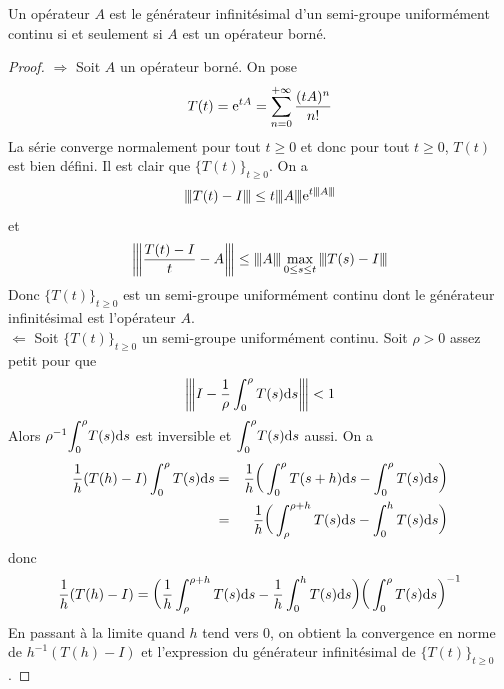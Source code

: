 \begin{theorem}\label{thm_equiv_generateur_op_borne}
    Un opérateur $A$ est le générateur infinitésimal d'un semi-groupe uniformément continu si et seulement si $A$ est un opérateur borné.
\end{theorem}

\begin{proof}
    $\boxed{\Longrightarrow}$ Soit $A$ un opérateur borné. On pose 
    \begin{equation*}
        T(t) = \mathrm{e}^{tA} = \sum_{n=0}^{+\infty}\frac{(tA)^n}{n!}
    \end{equation*}
    La série converge normalement pour tout $t \geq 0$ et donc pour tout $t \geq 0$, $T(t)$ est bien défini. Il est clair que $\big\{T(t)\big\}_{t \geq 0}$. On a 
    \begin{equation*}
        {\left\vert\kern-0.25ex\left\vert \kern-0.25ex\left\vert T(t)-I \right\vert\kern-0.25ex\right\vert\kern-0.25ex\right\vert} \leq t{\left\vert\kern-0.25ex\left\vert \kern-0.25ex\left\vert A \right\vert\kern-0.25ex\right\vert\kern-0.25ex\right\vert}\mathrm{e}^{t{\left\vert\kern-0.25ex\left\vert \kern-0.25ex\left\vert A \right\vert\kern-0.25ex\right\vert\kern-0.25ex\right\vert}}
    \end{equation*}
    et 
    \begin{equation*}
        {\left\vert\kern-0.25ex\left\vert \kern-0.25ex\left\vert \frac{T(t)-I}{t}-A \right\vert\kern-0.25ex\right\vert\kern-0.25ex\right\vert} \leq {\left\vert\kern-0.25ex\left\vert \kern-0.25ex\left\vert A \right\vert\kern-0.25ex\right\vert\kern-0.25ex\right\vert}\max_{0\leq s \leq t}{\left\vert\kern-0.25ex\left\vert \kern-0.25ex\left\vert T(s)-I \right\vert\kern-0.25ex\right\vert\kern-0.25ex\right\vert}
    \end{equation*}
    Donc $\big\{T(t)\big\}_{t \geq 0}$ est un semi-groupe uniformément continu dont le générateur infinitésimal est l'opérateur $A$. \\
    $\boxed{\Longleftarrow}$ Soit $\big\{T(t)\big\}_{t \geq 0}$ un semi-groupe uniformément continu. Soit $\rho >0$ assez petit pour que 
    \begin{equation*}
        {\left\vert\kern-0.25ex\left\vert \kern-0.25ex\left\vert I-\frac{1}{\rho}\int_0^\rho T(s)\mathrm{d}s \right\vert\kern-0.25ex\right\vert\kern-0.25ex\right\vert} <1
    \end{equation*}
    Alors $\rho^{-1}\displaystyle{\int_0^\rho} T(s)\mathrm{d} s$ est inversible et $\displaystyle{\int_0^\rho} T(s)\mathrm{d} s$ aussi. On a 
    \begin{eqnarray*}
        \frac{1}{h}(T(h)-I)\int_0^\rho T(s)\mathrm{d} s &=& \frac{1}{h}\bigg(\int_0^\rho T(s+h)\mathrm{d} s - \int_0^\rho T(s)\mathrm{d} s\bigg)\\
        &=& \frac{1}{h} \bigg(\int_\rho^{\rho+h}T(s)\mathrm{d} s - \int_0^hT(s)\mathrm{d} s\bigg)
    \end{eqnarray*}
    donc 
    \begin{equation*}
        \frac{1}{h}(T(h)-I) = \bigg(\frac{1}{h}\int_\rho^{\rho+h}T(s)\mathrm{d} s - \frac{1}{h}\int_0^hT(s)\mathrm{d} s\bigg)\bigg(\int_0^{\rho}T(s)\mathrm{d} s\bigg)^{-1}
    \end{equation*}
    En passant à la limite quand $h$ tend vers $0$, on obtient la convergence en norme de $h^{-1}(T(h)-I)$ et l'expression du générateur infinitésimal de $\big\{T(t)\big\}_{t \geq 0}$.
\end{proof}

